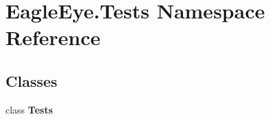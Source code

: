 \hypertarget{namespace_eagle_eye_1_1_tests}{}\section{Eagle\+Eye.\+Tests Namespace Reference}
\label{namespace_eagle_eye_1_1_tests}
\subsection*{Classes}
\begin{DoxyCompactItemize}
\item 
class {\bfseries Tests}
\end{DoxyCompactItemize}
